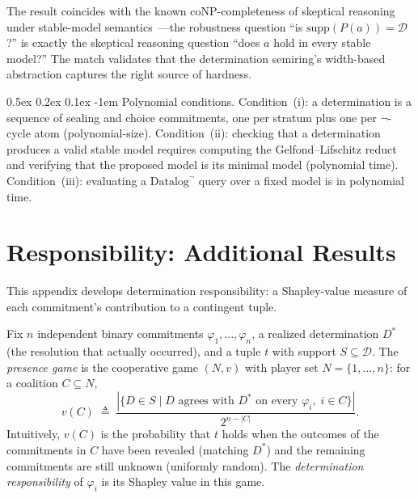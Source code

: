 \documentclass[acmsmall,review,anonymous]{acmart}
\makeatletter
\renewcommand{\paragraph}{\@startsection{paragraph}{4}{\z@}%
  {0.5ex \@plus 0.2ex \@minus 0.1ex}%
  {-1em}%
  {\normalfont\normalsize\bfseries}}
\theoremstyle{remark}
\numberwithin{definition}{section}
\numberwithin{theorem}{section}
\numberwithin{lemma}{section}
\numberwithin{corollary}{section}
\numberwithin{remark}{section}
\numberwithin{example}{section}
\numberwithin{observation}{section}
\numberwithin{assumption}{section}
\makeatother
\begin{document}
The result coincides with the known coNP-completeness of skeptical
reasoning under stable-model
semantics~\cite{marek1991autoepistemic}---the robustness question
``is $\mathrm{supp}(P(a)) = \mathcal{D}$?'' is exactly the skeptical
reasoning question ``does $a$ hold in every stable model?''
The match validates that the determination semiring's width-based
abstraction captures the right source of hardness.

\paragraph{Polynomial conditions.}
Condition~(i): a determination is a sequence of sealing and choice
commitments, one per stratum plus one per $\neg$-cycle atom
(polynomial-size).
Condition~(ii): checking that a determination produces a valid stable
model requires computing the Gelfond--Lifschitz
reduct~\cite{gelfond1988stable} and verifying that the proposed model
is its minimal model (polynomial time).
Condition~(iii): evaluating a $\mbox{Datalog}^\neg$ query over a fixed model is in
polynomial time.

\section{Responsibility: Additional Results}
\label{app:multi-layer-resp}
\label{app:responsibility-details}
\label{sec:responsibility}

This appendix develops determination responsibility: a Shapley-value
measure of each commitment's contribution to a contingent tuple.

Fix $n$ independent binary commitments
$\varphi_1, \ldots, \varphi_n$, a realized determination $D^*$
(the resolution that actually occurred), and a
tuple $t$ with support $S \subseteq \mathcal{D}$.
The \emph{presence game} is the cooperative game $(N, v)$ with player
set $N = \{1,\ldots,n\}$: for a coalition $C \subseteq N$,
\[
v(C) \;\triangleq\;
\frac{|\{D \in S \mid D \text{ agrees with } D^* \text{ on every }
\varphi_i,\; i \in C\}|}{2^{n-|C|}}.
\]
Intuitively, $v(C)$ is the probability that $t$ holds when the
outcomes of the commitments in $C$ have been revealed (matching $D^*$)
and the remaining commitments are still unknown (uniformly random).
The \emph{determination responsibility} of $\varphi_i$ is its Shapley
value in this game.
\end{document}
